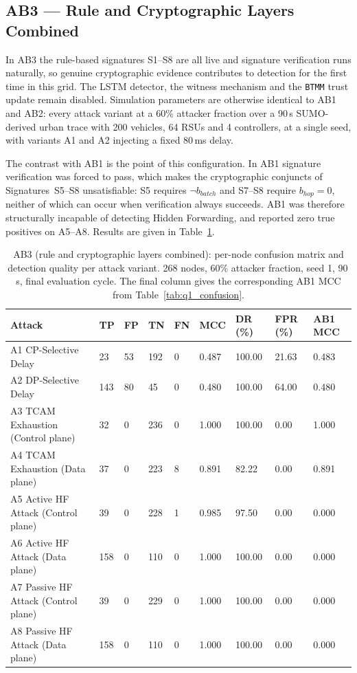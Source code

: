 \documentclass[12pt, a4paper]{report}
\begin{document}
{{\subsection{AB3 --- Rule and Cryptographic Layers Combined}
\label{sec:q5_results}

In AB3 the rule-based signatures S1--S8 are all live and
signature verification runs naturally, so genuine
cryptographic evidence contributes to detection for the first
time in this grid. The \ac{LSTM} detector, the witness
mechanism and the \texttt{BTMM} trust update remain disabled.
Simulation parameters are otherwise identical to AB1 and AB2:
every attack variant at a 60\% attacker fraction over a 90\,s
\ac{SUMO}-derived urban trace with 200 vehicles, 64 \ac{RSU}s
and 4 controllers, at a single seed, with variants A1 and A2
injecting a fixed 80\,ms delay.

The contrast with AB1 is the point of this configuration. In
AB1 signature verification was forced to pass, which makes the
cryptographic conjuncts of Signatures~S5--S8 unsatisfiable:
S5 requires $\neg b_{batch}$ and S7--S8 require $b_{hop}{=}0$,
neither of which can occur when verification always succeeds.
AB1 was therefore structurally incapable of detecting Hidden
Forwarding, and reported zero true positives on A5--A8.
Results are given in Table~\ref{tab:q5_confusion}.

\begin{table}[H]
\centering
\caption{AB3 (rule and cryptographic layers combined): per-node
confusion matrix and detection quality per attack variant. 268
nodes, 60\% attacker fraction, seed 1, 90\,s, final evaluation
cycle. The final column gives the corresponding AB1 \ac{MCC}
from Table~\ref{tab:q1_confusion}.}
\label{tab:q5_confusion}
\renewcommand{\arraystretch}{1.1}
\footnotesize
\begin{tabular}{|p{3.5cm}|p{0.7cm}|p{0.7cm}|p{0.7cm}|p{0.7cm}|p{1.1cm}|p{1.1cm}|p{1.1cm}|p{1.1cm}|}
\hline
\textbf{Attack} & \textbf{TP} & \textbf{FP} & \textbf{TN} &
\textbf{FN} & \textbf{MCC} & \textbf{DR (\%)} &
\textbf{FPR (\%)} & \textbf{AB1 MCC} \\
\hline
A1 CP-Selective Delay & 23 & 53 & 192 & 0 & 0.487 & 100.00 & 21.63 & 0.483 \\
\hline
A2 DP-Selective Delay & 143 & 80 & 45 & 0 & 0.480 & 100.00 & 64.00 & 0.480 \\
\hline
A3 TCAM Exhaustion (Control plane) & 32 & 0 & 236 & 0 & 1.000 & 100.00 & 0.00 & 1.000 \\
\hline
A4 TCAM Exhaustion (Data plane) & 37 & 0 & 223 & 8 & 0.891 & 82.22 & 0.00 & 0.891 \\
\hline
A5 Active HF Attack (Control plane) & 39 & 0 & 228 & 1 & 0.985 & 97.50 & 0.00 & 0.000 \\
\hline
A6 Active HF Attack (Data plane) & 158 & 0 & 110 & 0 & 1.000 & 100.00 & 0.00 & 0.000 \\
\hline
A7 Passive HF Attack (Control plane) & 39 & 0 & 229 & 0 & 1.000 & 100.00 & 0.00 & 0.000 \\
\hline
A8 Passive HF Attack (Data plane) & 158 & 0 & 110 & 0 & 1.000 & 100.00 & 0.00 & 0.000 \\
\hline
\end{tabular}
\end{table}

}}
\end{document}
